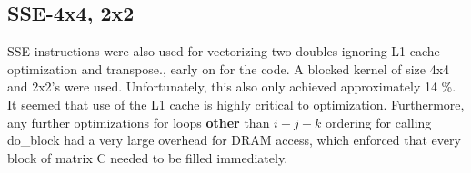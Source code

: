 \documentclass[12pt]{article}
\begin{document}
\subsection{SSE-4x4, 2x2}
SSE instructions were also used for vectorizing two doubles ignoring L1 cache optimization and transpose., early on for the code. A blocked kernel of size 4x4 and 2x2's were used. Unfortunately, this also only achieved approximately 14 \%. It seemed that use of the L1 cache is highly critical to optimization. Furthermore, any further optimizations for loops \textbf{other} than $i-j-k$ ordering for calling do\_block had a very large overhead for DRAM access, which enforced that every block of matrix C needed to be filled immediately. 
 
 
\end{document}
